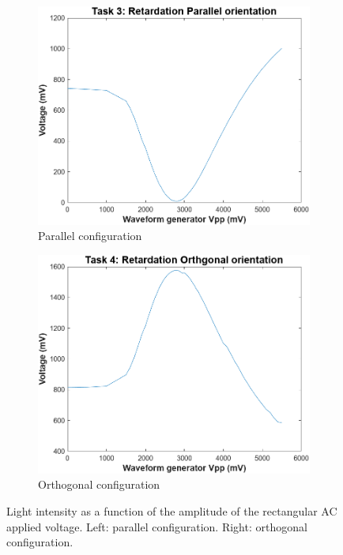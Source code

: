 \documentclass[12pt,a4paper]{article}
\begin{document}
\begin{figure}[H]
    \centering
    \begin{subfigure}[b]{0.48\linewidth}
        \centering
        \includegraphics[width=\linewidth]{figs/task3_transmittance.png}
        \caption{Parallel configuration}
        \label{fig:t3}
    \end{subfigure}\hfill
    \begin{subfigure}[b]{0.48\linewidth}
        \centering
        \includegraphics[width=\linewidth]{figs/task4_transmittance.png}
        \caption{Orthogonal configuration}
        \label{fig:t4}
    \end{subfigure}

    \caption{Light intensity as a function of the amplitude of the rectangular AC applied voltage. Left: parallel configuration. Right: orthogonal configuration.}
    \label{fig:t3_4}
\end{figure}
\end{document}
